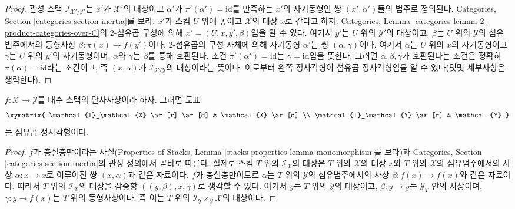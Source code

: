 \begin{proof}
관성 스택 $\mathcal{I}_{\mathcal{X}'/\mathcal{Y}'}$는 $x'$가
$\mathcal{X}'$의 대상이고 $\alpha'$가 $\pi'(\alpha') = \text{id}$를
만족하는 $x'$의 자기동형인 쌍 $(x', \alpha')$들의 범주로 정의된다.
Categories, Section \ref{categories-section-inertia}를 보라.
$x'$가 스킴 $U$ 위에 놓이고 $\mathcal{X}$의 대상 $x$로 간다고 하자.
Categories, Lemma \ref{categories-lemma-2-product-categories-over-C}의
$2$-섬유곱 구성에 의해
$x' = (U, x, y', \beta)$임을 알 수 있다. 여기서 $y'$는 $U$ 위의
$\mathcal{Y}'$의 대상이고, $\beta$는 $U$ 위의 $\mathcal{Y}$의
섬유범주에서의 동형사상 $\beta : \pi(x) \to f(y')$이다.
$2$-섬유곱의 구성 자체에 의해 자기동형 $\alpha'$는 쌍
$(\alpha, \gamma)$이다. 여기서 $\alpha$는 $U$ 위의 $x$의 자기동형이고
$\gamma$는 $U$ 위의 $y'$의 자기동형이며, $\alpha$와 $\gamma$는
$\beta$를 통해 호환된다. 조건 $\pi'(\alpha') = \text{id}$는
$\gamma = \text{id}$임을 뜻한다. 그러면 $\alpha, \beta, \gamma$가
호환된다는 조건은 정확히 $\pi(\alpha) = \text{id}$라는 조건이고,
즉 $(x, \alpha)$가 $\mathcal{I}_{\mathcal{X}/\mathcal{Y}}$의
대상이라는 뜻이다. 이로부터 왼쪽 정사각형이 섬유곱 정사각형임을
알 수 있다(몇몇 세부사항은 생략한다).
\end{proof}

\begin{lemma}
\label{lemma-monomorphism-cartesian-square-inertia}
$f : \mathcal{X} \to \mathcal{Y}$를 대수 스택의 단사사상이라 하자.
그러면 도표
$$
\xymatrix{
\mathcal{I}_\mathcal{X} \ar[r] \ar[d] &
\mathcal{X} \ar[d] \\
\mathcal{I}_\mathcal{Y} \ar[r] &
\mathcal{Y}
}
$$
는 섬유곱 정사각형이다.
\end{lemma}

\begin{proof}
$f$가 충실충만이라는 사실(Properties of Stacks, Lemma
\ref{stacks-properties-lemma-monomorphism}를 보라)과 Categories, Section
\ref{categories-section-inertia}의 관성 정의에서 곧바로 따른다.
실제로 스킴 $T$ 위의 $\mathcal{I}_\mathcal{X}$의 대상은 $T$ 위의
$\mathcal{X}$의 대상 $x$와 $T$ 위의 $\mathcal{X}$의 섬유범주에서의
사상 $\alpha : x \to x$로 이루어진 쌍 $(x, \alpha)$과 같은 자료이다.
$f$가 충실충만이므로 $\alpha$는 $T$ 위의 $\mathcal{Y}$의 섬유범주에서의
사상 $\beta : f(x) \to f(x)$와 같은 자료이다. 따라서 $T$ 위의
$\mathcal{I}_\mathcal{X}$의 대상을 삼중항 $((y, \beta), x, \gamma)$로
생각할 수 있다. 여기서 $y$는 $T$ 위의 $\mathcal{Y}$의 대상이고,
$\beta : y \to y$는 $\mathcal{Y}_T$ 안의 사상이며,
$\gamma : y \to f(x)$는 $T$ 위의 동형사상이다. 즉 이는 $T$ 위의
$\mathcal{I}_\mathcal{Y} \times_\mathcal{Y} \mathcal{X}$의 대상이다.
\end{proof}

